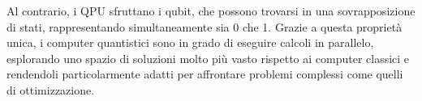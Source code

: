 Al contrario, i QPU sfruttano i qubit, che possono 
trovarsi in una sovrapposizione di stati, rappresentando simultaneamente 
sia 0 che 1. Grazie a questa proprietà unica, i computer quantistici 
sono in grado di eseguire calcoli in parallelo, esplorando uno spazio 
di soluzioni molto più vasto rispetto ai computer classici e rendendoli 
particolarmente adatti per affrontare problemi complessi come quelli di 
ottimizzazione.
